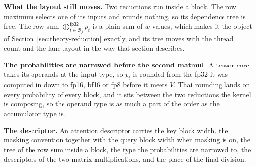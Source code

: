 \documentclass[sigplan,nonacm]{acmart}
\newcommand{\dt}[1]{\mathsf{#1}}
\newcommand{\fpsum}[1]{\bigoplus\nolimits^{\dt{#1}}}
\begin{document}
\textbf{What the layout still moves.} Two reductions run inside a block. The row
maximum selects one of its inputs and rounds nothing, so its dependence tree is
free. The row sum $\fpsum{fp32}_{t \in \mathcal{B}_j} p_t$ is a plain sum of $w$
values, which makes it the object of Section~\ref{sec:theory-reduction} exactly,
and its tree moves with the thread count and the lane layout in the way that
section describes.

\textbf{The probabilities are narrowed before the second matmul.} A tensor core
takes its operands at the input type, so $p_t$ is rounded from the fp32 it was
computed in down to fp16, bf16 or fp8 before it meets $V$. That rounding lands
on every probability of every block, and it sits between the two reductions the
kernel is composing, so the operand type is as much a part of the order as the
accumulator type is.

\textbf{The descriptor.} An attention descriptor carries the key block width,
the masking convention together with the query block width when masking is on,
the tree of the row sum inside a block, the type the probabilities are narrowed
to, the descriptors of the two matrix multiplications, and the place of the
final division.





\end{document}
